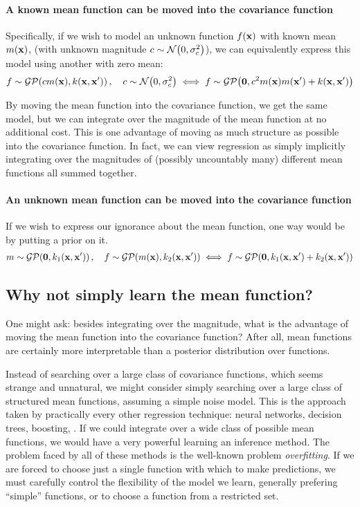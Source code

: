 \paragraph{A known mean function can be moved into the covariance function}
Specifically, if we wish to model an unknown function $f({\bf{x}})$ with known mean $m({\bf{x}})$, (with unknown magnitude $c \sim \mathcal{N}\!\left(0,\sigma^2_c\right)$), we can equivalently express this model using another \gp{} with zero mean:
%
\begin{align}
f \sim \mathcal{GP}\!\left(c m({\bf{x}}),k({\bf{x}},{\bf{x}}')\right), \quad c \sim \mathcal{N}\!\left(0,\sigma^2_c\right)
\iff f \sim \mathcal{GP}\!\left( {\bf{0}} , c^2 m({\bf{x}}) m({\bf{x}}') + k({\bf{x}},{\bf{x}}')\right)
\end{align}

By moving the mean function into the covariance function, we get the same model, but we can integrate over the magnitude of the mean function at no additional cost.
This is one advantage of moving as much structure as possible into the covariance function.
In fact, we can view \gp{} regression as simply implicitly integrating over the magnitudes of (possibly uncountably many) different mean functions all summed together.

\paragraph{An unknown mean function can be moved into the covariance function}

If we wish to express our ignorance about the mean function, one way would be by putting a \gp{} prior on it.
%
\begin{align}
m \sim \mathcal{GP}\!\left({\bf{0}},k_1({\bf{x}},{\bf{x}}')\right), \quad
f \sim \mathcal{GP}\!\left(m({\bf{x}}),k_2({\bf{x}},{\bf{x}}')\right)
\iff 
f \sim \mathcal{GP}\!\left({\bf{0}},k_1({\bf{x}},{\bf{x}}') + k_2({\bf{x}},{\bf{x}}')\right)
\end{align}


\subsection{Why not simply learn the mean function?}
One might ask: besides integrating over the magnitude, what is the advantage of moving the mean function into the covariance function?
After all, mean functions are certainly more interpretable than a posterior distribution over functions.

Instead of searching over a large class of covariance functions, which seems strange and unnatural, we might consider simply searching over a large class of structured mean functions, assuming a simple \iid noise model.
This is the approach taken by practically every other regression technique: neural networks, decision trees, boosting, \etc.
If we could integrate over a wide class of possible mean functions, we would have a very powerful learning an inference method.
The problem faced by all of these methods is the well-known problem \emph{overfitting}.
If we are forced to choose just a single function with which to make predictions, we must carefully control the flexibility of the model we learn, generally prefering ``simple'' functions, or to choose a function from a restricted set.

